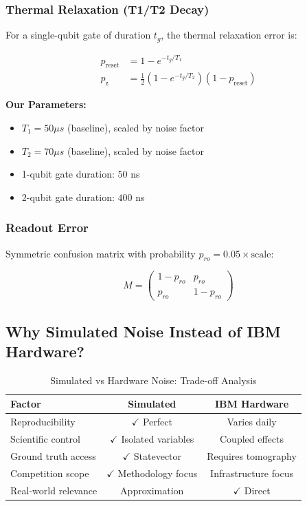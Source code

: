 \documentclass[11pt, a4paper]{article}
\begin{document}
\subsubsection{Thermal Relaxation (T1/T2 Decay)}

For a single-qubit gate of duration $t_g$, the thermal relaxation error is:

\begin{align}
p_{\text{reset}} &= 1 - e^{-t_g/T_1} \\
p_{\text{z}} &= \frac{1}{2}(1 - e^{-t_g/T_2})(1 - p_{\text{reset}})
\end{align}

\textbf{Our Parameters:}
\begin{itemize}
    \item $T_1 = 50 \mu s$ (baseline), scaled by noise factor
    \item $T_2 = 70 \mu s$ (baseline), scaled by noise factor
    \item 1-qubit gate duration: $50$ ns
    \item 2-qubit gate duration: $400$ ns
\end{itemize}

\subsubsection{Readout Error}

Symmetric confusion matrix with probability $p_{ro} = 0.05 \times \text{scale}$:

\begin{equation}
M = \begin{pmatrix} 1-p_{ro} & p_{ro} \\ p_{ro} & 1-p_{ro} \end{pmatrix}
\end{equation}

\subsection{Why Simulated Noise Instead of IBM Hardware?}

\begin{table}[H]
\centering
\caption{Simulated vs Hardware Noise: Trade-off Analysis}
\begin{tabular}{@{}lcc@{}}
\toprule
\textbf{Factor} & \textbf{Simulated} & \textbf{IBM Hardware} \\ \midrule
Reproducibility & $\checkmark$ Perfect & Varies daily \\
Scientific control & $\checkmark$ Isolated variables & Coupled effects \\
Ground truth access & $\checkmark$ Statevector & Requires tomography \\
Competition scope & $\checkmark$ Methodology focus & Infrastructure focus \\
Real-world relevance & Approximation & $\checkmark$ Direct \\
\bottomrule
\end{tabular}
\end{table}
\end{document}

